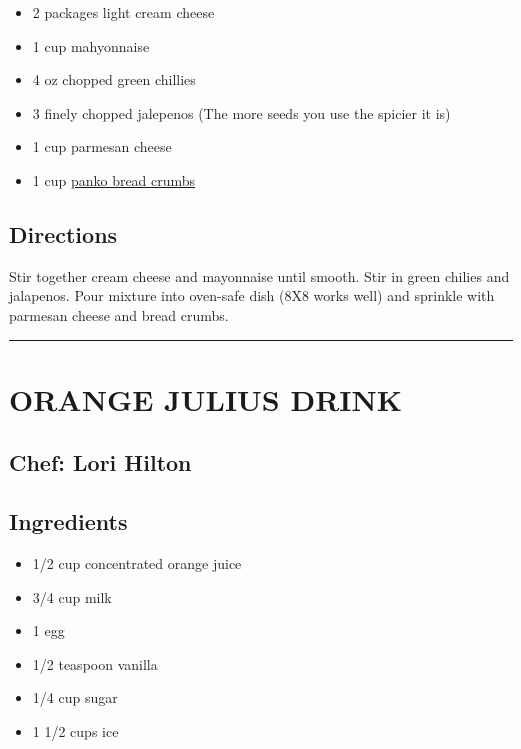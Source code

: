 \documentclass[
]{book}
\providecommand{\tightlist}{%
  \setlength{\itemsep}{0pt}\setlength{\parskip}{0pt}}
\begin{document}
\begin{itemize}
\tightlist
\item
  2 packages light cream cheese
\item
  1 cup mahyonnaise
\item
  4 oz chopped green chillies
\item
  3 finely chopped jalepenos (The more seeds you use the spicier it is)
\item
  1 cup parmesan cheese
\item
  1 cup \href{https://en.wikipedia.org/wiki/Bread_crumbs\#Panko}{panko bread crumbs}
\end{itemize}

\hypertarget{directions-8}{%
\subsection*{Directions}\label{directions-8}}


Stir together cream cheese and mayonnaise until smooth. Stir in green chilies and jalapenos. Pour mixture into oven-safe dish (8X8 works well) and sprinkle with parmesan cheese and bread crumbs.

\begin{center}\rule{0.5\linewidth}{0.5pt}\end{center}

\hypertarget{orange-julius-drink}{%
\section*{ORANGE JULIUS DRINK}\label{orange-julius-drink}}


\hypertarget{chef-lori-hilton}{%
\subsection*{Chef: Lori Hilton}\label{chef-lori-hilton}}


\hypertarget{ingredients-9}{%
\subsection*{Ingredients}\label{ingredients-9}}


\begin{itemize}
\tightlist
\item
  1/2 cup concentrated orange juice
\item
  3/4 cup milk
\item
  1 egg
\item
  1/2 teaspoon vanilla
\item
  1/4 cup sugar
\item
  1 1/2 cups ice
\end{itemize}
\end{document}
